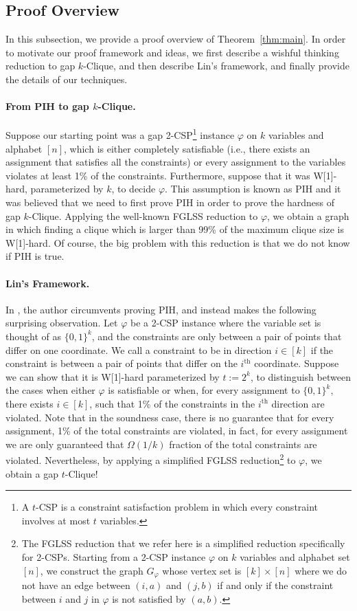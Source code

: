 \documentclass[10pt,a4paper]{article}
\begin{document}
 \subsection{Proof Overview}\label{sec:overview}
 In this subsection, we provide a proof overview of Theorem~\ref{thm:main}. In order to motivate our proof framework and ideas, we first describe a wishful thinking reduction to gap $k$-Clique, and then describe Lin's framework, and finally provide the details of our techniques.  
 
 \paragraph{From PIH to gap $k$-Clique.} Suppose our starting point was a gap 2-CSP\footnote{A $t$-CSP is a constraint satisfaction problem in which every constraint involves at most $t$ variables.} instance $\varphi$ on $k$ variables and alphabet $[n]$, which is either completely satisfiable (i.e., there exists an assignment that satisfies all the constraints) or every assignment to the variables violates at least 1\% of the constraints.  Furthermore, suppose that  it was W[1]-hard, parameterized by $k$, to decide $\varphi$. This assumption is known as PIH and it was believed \cite{CGG06} that we need to first prove PIH in order to prove the hardness of gap $k$-Clique. Applying the well-known FGLSS reduction to $\varphi$, we 
 obtain a graph in which finding a clique which is larger than 99\% of the maximum clique size is W[1]-hard. Of course, the big problem with this reduction is that we do not know if PIH is true. 


\paragraph{Lin's Framework.} In \cite{L21}, the author circumvents proving PIH, and instead makes the following surprising observation. Let $\varphi$ be a 2-CSP  instance where the variable set is thought of as $\{0,1\}^k$, and the constraints are only between a pair of points that differ  on one coordinate. We call a constraint to be in direction $i\in[k]$ if the constraint is between a pair of points that differ on the $i^{\text{th}}$ coordinate. Suppose we can show that it is W[1]-hard parameterized by $t:=2^k$, to distinguish between the cases when either $\varphi$ is satisfiable or when, for every assignment to $\{0,1\}^k$, there exists $i\in[k]$, such that 1\% of the constraints in the $i^{\text{th}}$ direction are violated. Note that in the soundness case, there is no guarantee that for every  assignment, 1\% of the total constraints are violated, in fact, for every  assignment we are only guaranteed that  $\Omega(1/k)$ fraction of the total constraints are violated. 
Nevertheless, by applying a simplified FGLSS reduction\footnote{The FGLSS reduction that we refer here is a simplified reduction specifically for 2-CSPs. Starting from a 2-CSP instance $\varphi$ on $k$ variables and alphabet set $[n]$, we construct the graph $G_{\varphi}$ whose vertex set is $[k]\times [n]$ where we do not have an edge between $(i,a)$ and $(j,b)$ if and only if the constraint between $i$ and $j$ in $\varphi$ is not satisfied by $(a,b)$.} to $\varphi$, we obtain a gap $t$-Clique! 
\end{document}
